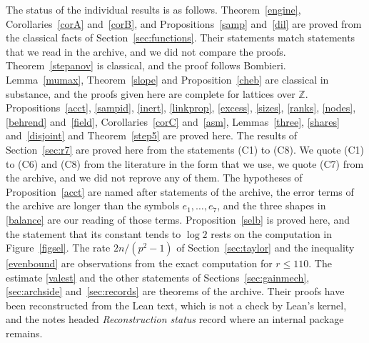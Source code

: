 \documentclass[11pt,letterpaper]{article}
\numberwithin{equation}{section}
\begin{document}
The status of the individual results is as follows. Theorem~\ref{engine}, Corollaries~\ref{corA} and~\ref{corB}, and Propositions~\ref{samp} and~\ref{dil} are proved from the classical facts of Section~\ref{sec:functions}. Their statements match statements that we read in the archive, and we did not compare the proofs. Theorem~\ref{stepanov} is classical, and the proof follows Bombieri. Lemma~\ref{mumax}, Theorem~\ref{slope} and Proposition~\ref{cheb} are classical in substance, and the proofs given here are complete for lattices over $\mathbb Z$. Propositions~\ref{acct}, \ref{sampid}, \ref{inert}, \ref{linkprop}, \ref{excess}, \ref{sizes}, \ref{ranks}, \ref{nodes}, \ref{behrend} and~\ref{field}, Corollaries~\ref{corC} and~\ref{asm}, Lemmas~\ref{three}, \ref{shares} and~\ref{disjoint} and Theorem~\ref{step5} are proved here. The results of Section~\ref{sec:r7} are proved here from the statements (C1) to (C8). We quote (C1) to (C6) and (C8) from the literature in the form that we use, we quote (C7) from the archive, and we did not reprove any of them. The hypotheses of Proposition~\ref{acct} are named after statements of the archive, the error terms of the archive are longer than the symbols $e_1,\dots,e_7$, and the three shapes in \eqref{balance} are our reading of those terms. Proposition~\ref{selb} is proved here, and the statement that its constant tends to $\log2$ rests on the computation in Figure~\ref{figsel}. The rate $2n/(p^2-1)$ of Section~\ref{sec:taylor} and the inequality \eqref{evenbound} are observations from the exact computation for $r\le110$. The estimate \eqref{valest} and the other statements of Sections~\ref{sec:gainmech}, \ref{sec:archside} and~\ref{sec:records} are theorems of the archive. Their proofs have been reconstructed from the Lean text, which is not a check by Lean's kernel, and the notes headed \emph{Reconstruction status} record where an internal package remains.
\end{document}
